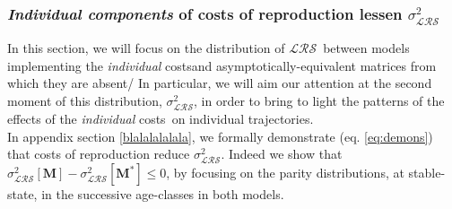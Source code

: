 \documentclass[10pt,a4paper]{article}
\newcommand{\M}{$\mathbf{M}$}
\newcommand{\LRO}{$\mathcal{LRS}$}
\newcommand{\PCoR}{\emph{individual} costs}
\newcommand{\vLRO}{$\sigma_{\mathrm{\mathcal{LRS}}}^2$}
\newcommand{\vd}{$\sigma_{\mathrm{d}}^2$}
\begin{document}

  

\subsubsection{\emph{Individual components} of costs of reproduction lessen \vLRO}  
\label{ahahah}

In this section, we will focus on the distribution of \LRO\ between models implementing the \PCoR and asymptotically-equivalent matrices from which they are absent/ %
In particular, we will aim our attention at the second moment of this distribution, \vLRO, in order to bring to light the patterns of the effects of the \PCoR\ on individual trajectories. \\

In appendix section \ref{blalalalalala}, we formally demonstrate (eq. \ref{eq:demons}) that costs of reproduction reduce \vLRO. Indeed we show that $ \sigma^{2}_{\mathcal{LRS}}\left[ \mathbf{M}\right] -\sigma^{2}_{\mathcal{LRS}}\left[ \mathbf{M^{*}}\right] \leq 0$, by focusing on the parity distributions, at stable-state, in the successive age-classes in both models. 
 
\end{document}
